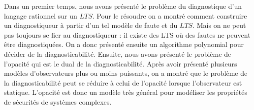 \documentclass[10pt,a4paper]{article}
\begin{document}
Dans un premier temps, nous avons présenté le problème du diagnostique d'un langage rationnel sur un $LTS$. Pour le résoudre on a montré comment construire un diagnostiqueur à partir d'un tel modèle de faute et du $LTS$. Mais on ne peut pas toujours se fier au diagnostiqueur : il existe des LTS où des fautes ne peuvent être diagnostiquées. On a donc présenté ensuite un algorithme polynomial pour décider de la diagnosticabilité. Ensuite, nous avons présenté le problème de l'opacité  qui est le dual de la diagnosticabilité. Après avoir présenté plusieurs modèles d'observateurs plus ou moins puissants, on a montré que le problème de la diagnosticabilité peut se réduire à celui de l'opacité lorsque l'observateur est statique. L'opacité est donc un modèle très général pour modéliser les propriétés de sécurités de systèmes complexes.



\end{document}
